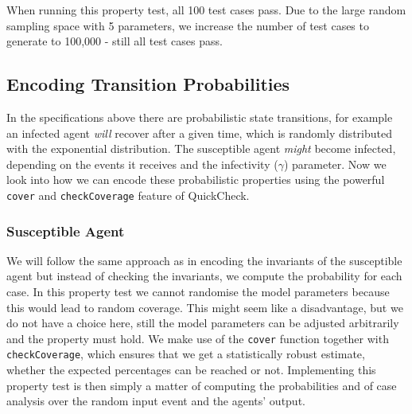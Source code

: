 When running this property test, all 100 test cases pass. Due to the large random sampling space with 5 parameters, we increase the number of test cases to generate to 100,000 - still all test cases pass.

\subsection{Encoding Transition Probabilities}
In the specifications above there are probabilistic state transitions, for example an infected agent \textit{will} recover after a given time, which is randomly distributed with the exponential distribution. The susceptible agent \textit{might} become infected, depending on the events it receives and the infectivity ($\gamma$) parameter. Now we look into how we can encode these probabilistic properties using the powerful \texttt{cover} and \texttt{checkCoverage} feature of QuickCheck.

\subsubsection{Susceptible Agent}
We will follow the same approach as in encoding the invariants of the susceptible agent but instead of checking the invariants, we compute the probability for each case. In this property test we cannot randomise the model parameters because this would lead to random coverage. This might seem like a disadvantage, but we do not have a choice here, still the model parameters can be adjusted arbitrarily and the property must hold. %
We make use of the \texttt{cover} function together with \texttt{checkCoverage}, which ensures that we get a statistically robust estimate, whether the expected percentages can be reached or not. Implementing this property test is then simply a matter of computing the probabilities and of case analysis over the random input event and the agents' output.

